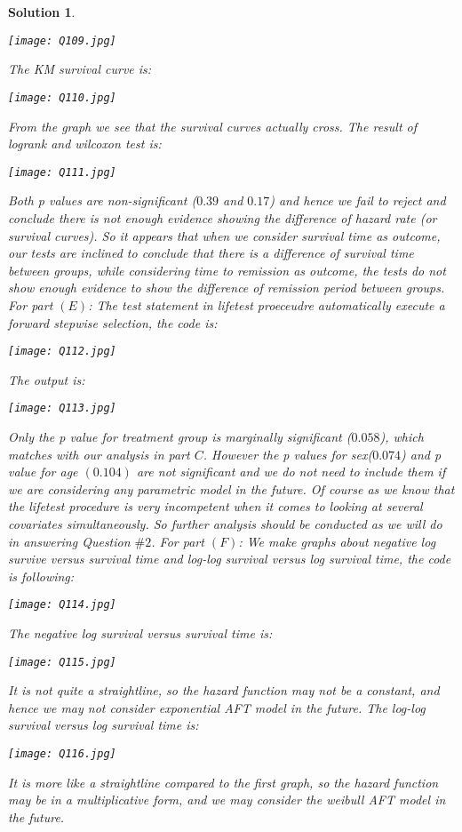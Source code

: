 \documentclass[11pt]{article}
\newtheorem{sol}{Solution}
\begin{document}
\begin{sol}
\begin{center}
		\texttt{[image: Q109.jpg]}
	\end{center}
	The KM survival curve is:
	\begin{center}
		\texttt{[image: Q110.jpg]}
	\end{center}
	From the graph we see that the survival curves actually cross.\vskip 2mm
	The result of logrank and wilcoxon test is:
	\begin{center}
		\texttt{[image: Q111.jpg]}
	\end{center}
	Both p values are non-significant ($0.39$ and $0.17$) and hence we fail to reject and conclude there is not enough evidence showing the difference of hazard rate (or survival curves).\vskip 2mm
	So it appears that when we consider survival time as outcome, our tests are inclined to conclude that there is a difference of survival time between groups, while considering time to remission as outcome, the tests do not show enough evidence to show the difference of remission period between groups.\vskip 2mm
	For part $(E)$:\vskip 2mm
	The test statement in lifetest proeceudre automatically execute a forward stepwise selection, the code is:
	\begin{center}
		\texttt{[image: Q112.jpg]}
	\end{center}
	The output is:
	\begin{center}
		\texttt{[image: Q113.jpg]}
	\end{center}
	Only the p value for treatment group is marginally significant ($0.058$), which matches with our analysis in part $C$. However the p values for sex($0.074$) and p value for age $(0.104)$ are not significant and we do not need to include them if we are considering any parametric model in the future.\vskip 2mm
	Of course as we know that the lifetest procedure is very incompetent when it comes to looking at several covariates simultaneously. So further analysis should be conducted as we will do in answering Question $\#2$.\vskip 2mm
	For part $(F)$:\vskip 2mm
	We make graphs about negative log survive versus survival time and log-log survival versus log survival time, the code is following:
	\begin{center}
		\texttt{[image: Q114.jpg]}
	\end{center}
	The negative log survival versus survival time is:
	\begin{center}
		\texttt{[image: Q115.jpg]}
	\end{center}
	It is not quite a straightline, so the hazard function may not be a constant, and hence we may not consider exponential AFT model in the future.\vskip 2mm
	The log-log survival versus log survival time is:
	\begin{center}
		\texttt{[image: Q116.jpg]}
	\end{center}
	It is more like a straightline compared to the first graph, so the hazard function may be in a multiplicative form, and we may consider the weibull AFT model in the future.
\end{sol}
\end{document}
